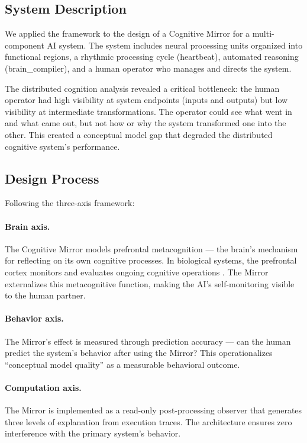 \documentclass[11pt,a4paper]{article}
\begin{document}
\subsection{System Description}

We applied the framework to the design of a Cognitive Mirror for a multi-component AI system. The system includes neural processing units organized into functional regions, a rhythmic processing cycle (heartbeat), automated reasoning (brain\_compiler), and a human operator who manages and directs the system.

The distributed cognition analysis revealed a critical bottleneck: the human operator had high visibility at system endpoints (inputs and outputs) but low visibility at intermediate transformations. The operator could see what went in and what came out, but not how or why the system transformed one into the other. This created a conceptual model gap that degraded the distributed cognitive system's performance.

\subsection{Design Process}

Following the three-axis framework:

\paragraph{Brain axis.} The Cognitive Mirror models prefrontal metacognition --- the brain's mechanism for reflecting on its own cognitive processes. In biological systems, the prefrontal cortex monitors and evaluates ongoing cognitive operations \citep{fleming2012}. The Mirror externalizes this metacognitive function, making the AI's self-monitoring visible to the human partner.

\paragraph{Behavior axis.} The Mirror's effect is measured through prediction accuracy --- can the human predict the system's behavior after using the Mirror? This operationalizes ``conceptual model quality'' as a measurable behavioral outcome.

\paragraph{Computation axis.} The Mirror is implemented as a read-only post-processing observer that generates three levels of explanation from execution traces. The architecture ensures zero interference with the primary system's behavior.
\end{document}
